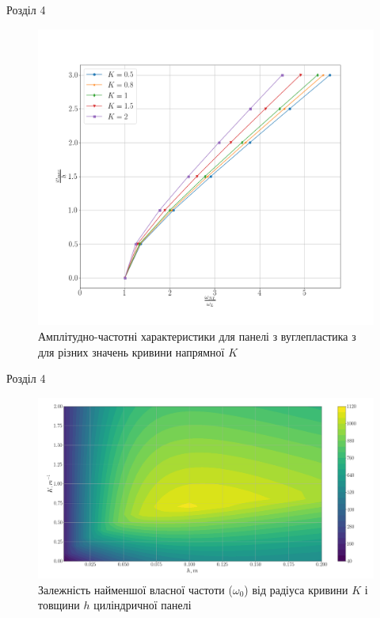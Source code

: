 \documentclass[8pt]{beamer}
\numberwithin{figure}{section}
\numberwithin{equation}{section}
\numberwithin{table}{section}
\begin{document}
\begin{frame}{Розділ 4}

\begin{figure}
	\includegraphics[scale=0.2]{pic/AFR_curvature.png}
		\caption{Амплітудно-частотні характеристики для панелі з вуглепластика з для різних значень кривини напрямної $K$}
		\label{fig:AFR_layers}
\end{figure}

\end{frame}

\begin{frame}{Розділ 4}

\begin{figure}
	\includegraphics[scale=0.2]{pic/thickness_curvature_contour_plot2.png}
		\caption{Залежність найменшої власної частоти ($\omega_0$) від радіуса кривини $K$ і товщини $h$ циліндричної панелі}
		\label{fig:omaga_K_h}
\end{figure}

\end{frame}
\end{document}
